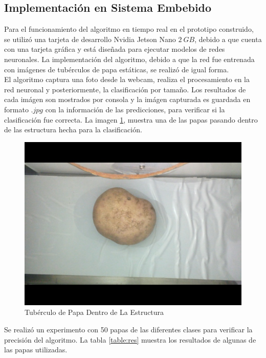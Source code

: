 	
	\subsection{Implementación en Sistema Embebido}
	
	Para el funcionamiento del algoritmo en tiempo real en el prototipo construido, se utilizó una tarjeta de desarrollo Nvidia Jetson Nano $2 \ GB$, debido a que cuenta con una tarjeta gráfica y está diseñada para ejecutar modelos de redes neuronales. La implementación del algoritmo, debido a que la red fue entrenada con imágenes de tubérculos de papa estáticas, se realizó de igual forma.\\
	
	El algoritmo captura una foto desde la webcam, realiza el procesamiento en la red neuronal y posteriormente, la clasificación por tamaño. Los resultados de cada imágen son mostrados por consola y la imágen capturada es guardada en formato $.jpg$ con la información de las predicciones, para verificar si la clasificación fue correcta. La imagen \ref{fig:implementacion}, muestra una de las papas pasando dentro de las estructura hecha para la clasificación.
	
	\begin{figure}[ht]
		\centering
		\includegraphics[scale=0.25]{Figs/implementacion.jpg}
		\caption{Tubérculo de Papa Dentro de La Estructura}
		\label{fig:implementacion}
	\end{figure}

	\newpage
	Se realizó un experimento con 50 papas de las diferentes clases para verificar la precisión del algoritmo. La tabla \ref{table:res} muestra los resultados de algunas de las papas utilizadas.
	
